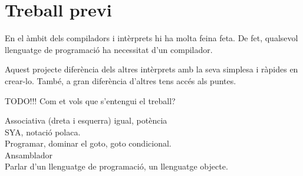 \section{Treball previ}
En el àmbit dels compiladors i intèrprets hi ha molta feina feta.
De fet, qualsevol llenguatge de programació ha necessitat d'un compilador.

Aquest projecte diferència dels altres intèrprets amb la seva simplesa i ràpides en crear-lo.
També, a gran diferència d'altres tens accés als puntes.

TODO!!!
{\color{blue}Com et vols que s'entengui el treball?}

{\color{blue}
Associativa (dreta i esquerra) igual, potència\\
SYA, notació polaca.\\
Programar, dominar el goto, goto condicional.\\
Ansamblador\\

Parlar d'un llenguatge de programació, un llenguatge objecte.
}
